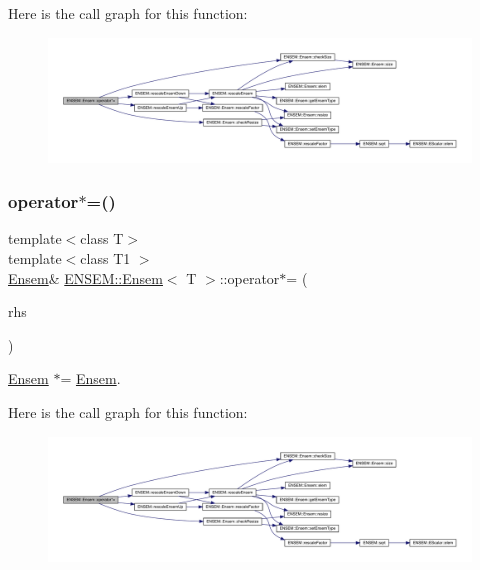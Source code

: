 Here is the call graph for this function\+:
\nopagebreak
\begin{figure}[H]
\begin{center}
\leavevmode
\includegraphics[width=350pt]{d7/d3e/classENSEM_1_1Ensem_ae6590e101b18547ec3d2682ecbea0371_cgraph}
\end{center}
\end{figure}
\mbox{\label{classENSEM_1_1Ensem_ae6590e101b18547ec3d2682ecbea0371}} 
\subsubsection{\texorpdfstring{operator$\ast$=()}{operator*=()}\hspace{0.1cm}{\footnotesize\ttfamily [5/6]}}
{\footnotesize\ttfamily template$<$class T$>$ \\
template$<$class T1 $>$ \\
\mbox{\hyperlink{classENSEM_1_1Ensem}{Ensem}}\& \mbox{\hyperlink{classENSEM_1_1Ensem}{E\+N\+S\+E\+M\+::\+Ensem}}$<$ T $>$\+::operator$\ast$= (\begin{DoxyParamCaption}\item[{const \mbox{\hyperlink{classENSEM_1_1Ensem}{Ensem}}$<$ T1 $>$ \&}]{rhs }\end{DoxyParamCaption})\hspace{0.3cm}{\ttfamily [inline]}}



\mbox{\hyperlink{classENSEM_1_1Ensem}{Ensem}} $\ast$= \mbox{\hyperlink{classENSEM_1_1Ensem}{Ensem}}. 

Here is the call graph for this function\+:
\nopagebreak
\begin{figure}[H]
\begin{center}
\leavevmode
\includegraphics[width=350pt]{d7/d3e/classENSEM_1_1Ensem_ae6590e101b18547ec3d2682ecbea0371_cgraph}
\end{center}
\end{figure}
\mbox{\label{classENSEM_1_1Ensem_ae6590e101b18547ec3d2682ecbea0371}} 
